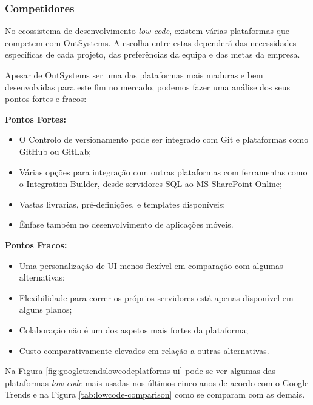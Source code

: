 \subsubsection{Competidores}\label{secsec:competidores}

    No ecossistema de desenvolvimento \textit{low-code}, existem várias plataformas que competem com OutSystems. A escolha entre estas dependerá das necessidades específicas de cada projeto, das preferências da equipa e das metas da empresa. 

    Apesar de OutSystems ser uma das plataformas mais maduras e bem desenvolvidas para este fim no mercado, podemos fazer uma análise dos seus pontos fortes e fracos:

    \textbf{Pontos Fortes:}
    \begin{itemize}
        \item O Controlo de versionamento pode ser integrado com Git e plataformas como GitHub ou GitLab;
        \item Várias opções para integração com outras plataformas com ferramentas como o \href{https://integrationbuilder.outsystems.com/}{Integration Builder}, desde servidores SQL ao MS SharePoint Online;
        \item Vastas livrarias, pré-definições, e templates disponíveis;
        \item Ênfase também no desenvolvimento de aplicações móveis.
    \end{itemize}

    \textbf{Pontos Fracos:}
    \begin{itemize}
        \item Uma personalização de UI menos flexível em comparação com algumas alternativas;
        \item Flexibilidade para correr os próprios servidores está apenas disponível em alguns planos;
        \item Colaboração não é um dos aspetos mais fortes da plataforma;
        \item Custo comparativamente elevados em relação a outras alternativas\cite{outsystems-vs-mendix}.
    \end{itemize}

    Na Figura \ref{fig:googletrendslowcodeplatforms-ui} pode-se ver algumas das plataformas \textit{low-code} mais usadas nos últimos cinco anos de acordo com o Google Trends e na Figura \ref{tab:lowcode-comparison} como se comparam com as demais.

